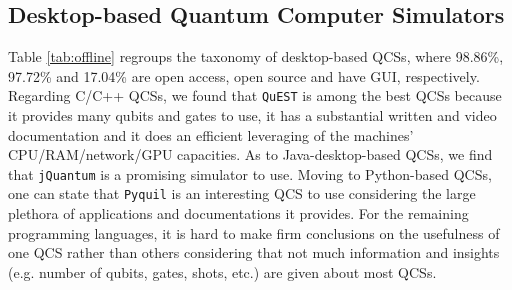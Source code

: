 \documentclass[conference]{IEEEtran}
\begin{document}
\subsection{Desktop-based Quantum Computer Simulators}

Table \ref{tab:offline} regroups the taxonomy of desktop-based QCSs, where 98.86\%, 97.72\% and 17.04\% are open access, open source and have GUI, respectively. Regarding C/C++ QCSs, we found that \texttt{QuEST} is among the best QCSs because it provides many qubits and gates to use, it has a substantial written and video documentation and it does an efficient leveraging of the machines' CPU/RAM/network/GPU capacities. As to Java-desktop-based QCSs, we find that \texttt{jQuantum} is a promising simulator to use. Moving to Python-based QCSs, one can state that \texttt{Pyquil} is an interesting QCS to use considering the large plethora of applications and documentations it provides. For the remaining programming languages, it is hard to make firm conclusions on the usefulness of one QCS rather than others considering that not much information and insights (e.g. number of qubits, gates, shots, etc.) are given about most QCSs. \\
\end{document}
